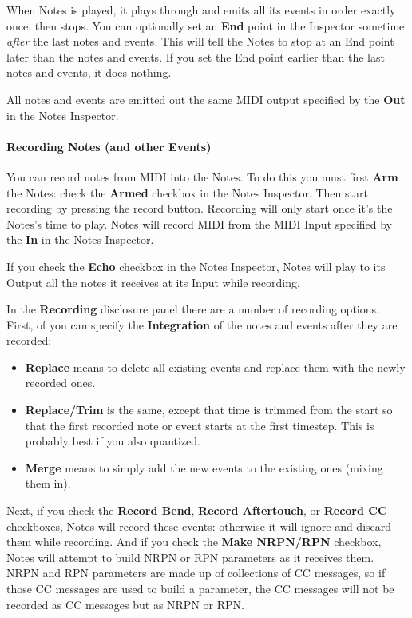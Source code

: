 \documentclass[twoside,10pt]{article}
\begin{document}
When Notes is played, it plays through and emits all its events in order exactly once, then stops.  You can optionally set an {\bf End} point in the Inspector sometime {\it after} the last notes and events.  This will tell the Notes to stop at an End point later than the notes and events.  If you set the End point earlier than the last notes and events, it does nothing.

All notes and events are emitted out the same MIDI output specified by the {\bf Out} in the Notes Inspector.

\paragraph{Recording Notes (and other Events)}

You can record notes from MIDI into the Notes.  To do this you must first {\bf Arm} the Notes: check the {\bf Armed} checkbox in the Notes Inspector.  Then start recording by pressing the record button.  Recording will only start once it's the Notes's time to play.  Notes will record MIDI from the MIDI Input specified by the {\bf In} in the Notes Inspector.

If you check the {\bf Echo} checkbox in the Notes Inspector, Notes will play to its Output all the notes it receives at its Input while recording.

In the {\bf Recording} disclosure panel there are a number of recording options.   First, of you can specify the {\bf Integration} of the notes and events after they are recorded:

\begin{itemize}
\item {\bf Replace} means to delete all existing events and replace them with the newly recorded ones.
\item {\bf Replace/Trim} is the same, except that time is trimmed from the start so that the first recorded note or event starts at the first timestep.  This is probably best if you also quantized.
\item {\bf Merge} means to simply add the new events to the existing ones (mixing them in).
\end{itemize}

Next, if you check the {\bf Record Bend}, {\bf Record Aftertouch}, or {\bf Record CC} checkboxes, Notes will record these events: otherwise it will ignore and discard them while recording.   And if you check the {\bf Make NRPN/RPN} checkbox, Notes will attempt to build NRPN or RPN parameters as it receives them.  NRPN and RPN parameters are made up of collections of CC messages, so if those CC messages are used to build a parameter, the CC messages will not be recorded as CC messages but as NRPN or RPN.  
\end{document}
